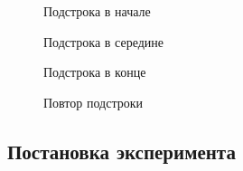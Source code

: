 \documentclass[a4paper,12pt]{article}
\begin{document}
\pagebreak

\begin{figure}[h!]
\caption{
Подстрока в начале}
\label{fig:t3}
\end{figure}

\begin{figure}[h!]
\caption{
Подстрока в середине}
\label{fig:t4}
\end{figure}

\begin{figure}[h!]
\caption{
Подстрока в конце}
\label{fig:t5}
\end{figure}

\begin{figure}[h!]
\caption{
Повтор подстроки}
\label{fig:t6}
\end{figure}

\pagebreak


\subsection{Постановка эксперимента}
    
\end{document}
